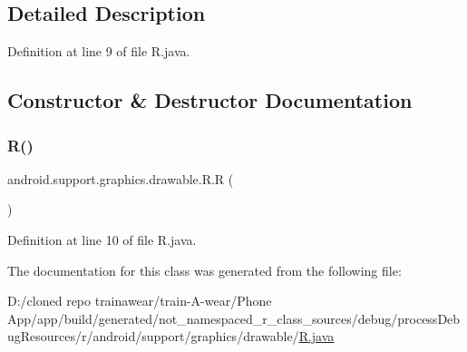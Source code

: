 \subsection{Detailed Description}


Definition at line 9 of file R.\+java.



\subsection{Constructor \& Destructor Documentation}
\mbox{\label{classandroid_1_1support_1_1graphics_1_1drawable_1_1_r_a5cc28100d772dee9f3d968e4e284eec3}} 
\subsubsection{\texorpdfstring{R()}{R()}}
{\footnotesize\ttfamily android.\+support.\+graphics.\+drawable.\+R.\+R (\begin{DoxyParamCaption}{ }\end{DoxyParamCaption})\hspace{0.3cm}{\ttfamily [private]}}



Definition at line 10 of file R.\+java.


\begin{DoxyCode}{0}

\end{DoxyCode}


The documentation for this class was generated from the following file\+:\begin{DoxyCompactItemize}
\item 
D\+:/cloned repo trainawear/train-\/\+A-\/wear/\+Phone App/app/build/generated/not\+\_\+namespaced\+\_\+r\+\_\+class\+\_\+sources/debug/process\+Debug\+Resources/r/android/support/graphics/drawable/\mbox{\hyperlink{process_debug_resources_2r_2android_2support_2graphics_2drawable_2_r_8java}{R.\+java}}\end{DoxyCompactItemize}
